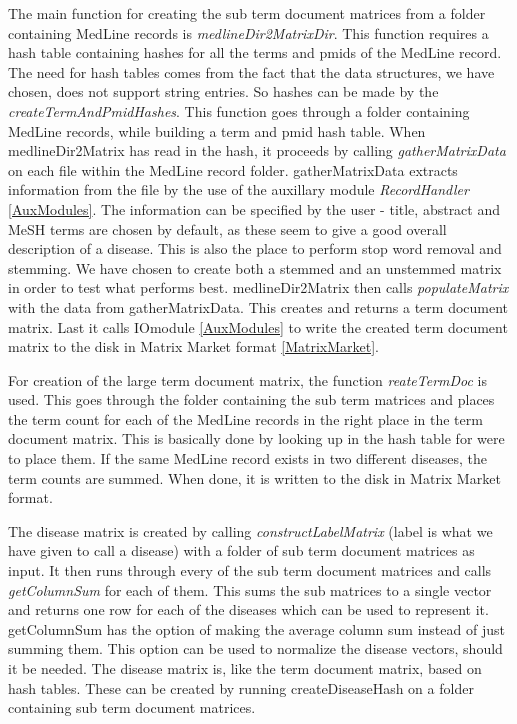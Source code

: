 The main function for creating the sub term document matrices from a
folder containing MedLine records is
\textit{medlineDir2MatrixDir}. This function requires a hash table
containing hashes for all the terms and pmids of the MedLine
record. The need for hash tables comes from the fact that the data
structures, we have chosen, does not support string entries. So hashes
can be made by the \textit{createTermAndPmidHashes}. This function
goes through a folder containing MedLine records, while building a
term and pmid hash table. When medlineDir2Matrix has read in the hash,
it proceeds by calling \textit{gatherMatrixData} on each file within
the MedLine record folder. gatherMatrixData extracts information from
the file by the use of the auxillary module \textit{RecordHandler}
\ref{AuxModules}. The information can be specified by the user -
title, abstract and MeSH terms are chosen by default, as these seem to
give a good overall description of a disease. This is also the place
to perform stop word removal and stemming. We have chosen to create
both a stemmed and an unstemmed matrix in order to test what performs
best. medlineDir2Matrix then calls \textit{populateMatrix} with the
data from gatherMatrixData. This creates and returns a term document
matrix. Last it calls IOmodule \ref{AuxModules} to write the created
term document matrix to the disk in Matrix Market format
\ref{MatrixMarket}.

For creation of the large term document matrix, the function
\textit{reateTermDoc} is used. This goes through the folder containing
the sub term matrices and places the term count for each of the
MedLine records in the right place in the term document matrix. This
is basically done by looking up in the hash table for were to place
them. If the same MedLine record exists in two different diseases, the
term counts are summed. When done, it is written to the disk in Matrix
Market format.

The disease matrix is created by calling \textit{constructLabelMatrix}
(label is what we have given to call a disease) with a folder of sub
term document matrices as input. It then runs through every of the sub
term document matrices and calls \textit{getColumnSum} for each of
them. This sums the sub matrices to a single vector and returns one
row for each of the diseases which can be used to represent
it. getColumnSum has the option of making the average column sum
instead of just summing them. This option can be used to normalize the
disease vectors, should it be needed. The disease matrix is, like the
term document matrix, based on hash tables. These can be created by
running createDiseaseHash on a folder containing sub term document
matrices.


